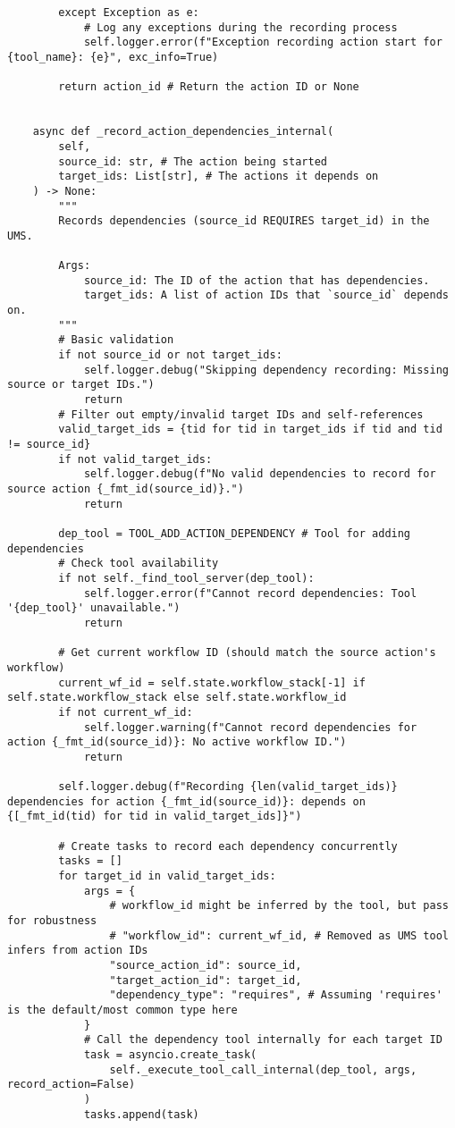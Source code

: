 \documentclass[12pt,a4paper]{article}
\begin{document}
\begin{pageablecode}
\begin{verbatim}
        except Exception as e:
            # Log any exceptions during the recording process
            self.logger.error(f"Exception recording action start for {tool_name}: {e}", exc_info=True)

        return action_id # Return the action ID or None


    async def _record_action_dependencies_internal(
        self,
        source_id: str, # The action being started
        target_ids: List[str], # The actions it depends on
    ) -> None:
        """
        Records dependencies (source_id REQUIRES target_id) in the UMS.

        Args:
            source_id: The ID of the action that has dependencies.
            target_ids: A list of action IDs that `source_id` depends on.
        """
        # Basic validation
        if not source_id or not target_ids:
            self.logger.debug("Skipping dependency recording: Missing source or target IDs.")
            return
        # Filter out empty/invalid target IDs and self-references
        valid_target_ids = {tid for tid in target_ids if tid and tid != source_id}
        if not valid_target_ids:
            self.logger.debug(f"No valid dependencies to record for source action {_fmt_id(source_id)}.")
            return

        dep_tool = TOOL_ADD_ACTION_DEPENDENCY # Tool for adding dependencies
        # Check tool availability
        if not self._find_tool_server(dep_tool):
            self.logger.error(f"Cannot record dependencies: Tool '{dep_tool}' unavailable.")
            return

        # Get current workflow ID (should match the source action's workflow)
        current_wf_id = self.state.workflow_stack[-1] if self.state.workflow_stack else self.state.workflow_id
        if not current_wf_id:
            self.logger.warning(f"Cannot record dependencies for action {_fmt_id(source_id)}: No active workflow ID.")
            return

        self.logger.debug(f"Recording {len(valid_target_ids)} dependencies for action {_fmt_id(source_id)}: depends on {[_fmt_id(tid) for tid in valid_target_ids]}")

        # Create tasks to record each dependency concurrently
        tasks = []
        for target_id in valid_target_ids:
            args = {
                # workflow_id might be inferred by the tool, but pass for robustness
                # "workflow_id": current_wf_id, # Removed as UMS tool infers from action IDs
                "source_action_id": source_id,
                "target_action_id": target_id,
                "dependency_type": "requires", # Assuming 'requires' is the default/most common type here
            }
            # Call the dependency tool internally for each target ID
            task = asyncio.create_task(
                self._execute_tool_call_internal(dep_tool, args, record_action=False)
            )
            tasks.append(task)


\end{verbatim}
\end{pageablecode}
\end{document}
